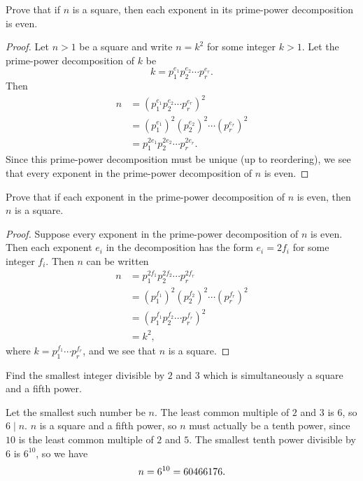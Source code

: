  Prove that if $n$ is a square, then each exponent in its
prime-power decomposition is even.
\begin{proof}
  Let $n>1$ be a square and write $n = k^2$ for some integer
  $k>1$. Let the prime-power decomposition of $k$ be
  \begin{equation*}
    k = p_1^{e_1}p_2^{e_2}\cdots p_r^{e_r}.
  \end{equation*}
  Then
  \begin{align*}
    n &= (p_1^{e_1}p_2^{e_2}\cdots p_r^{e_r})^2 \\
      &= (p_1^{e_1})^2(p_2^{e_2})^2\cdots(p_r^{e_r})^2 \\
      &= p_1^{2e_1}p_2^{2e_2}\cdots p_r^{2e_r}.
  \end{align*}
  Since this prime-power decomposition must be unique (up to
  reordering), we see that every exponent in the prime-power
  decomposition of $n$ is even.
\end{proof}

 Prove that if each exponent in the prime-power decomposition
of $n$ is even, then $n$ is a square.
\begin{proof}
  Suppose every exponent in the prime-power decomposition of $n$ is
  even. Then each exponent $e_i$ in the decomposition has the form
  $e_i = 2f_i$ for some integer $f_i$. Then $n$ can be written
  \begin{align*}
    n &= p_1^{2f_1}p_2^{2f_2}\cdots p_r^{2f_r} \\
      &= (p_1^{f_1})^2(p_2^{f_2})^2\cdots(p_r^{f_r})^2 \\
      &= (p_1^{f_1}p_2^{f_2}\cdots p_r^{f_r})^2 \\
      &= k^2,
  \end{align*}
  where $k = p_1^{f_1}\cdots p_r^{f_r}$, and we see that $n$ is a
  square.
\end{proof}

 Find the smallest integer divisible by $2$ and $3$ which is
simultaneously a square and a fifth power.
\begin{solution}
  Let the smallest such number be $n$. The least common multiple of
  $2$ and $3$ is $6$, so $6\mid n$. $n$ is a square and a fifth power,
  so $n$ must actually be a tenth power, since $10$ is the least
  common multiple of $2$ and $5$. The smallest tenth power divisible
  by $6$ is $6^{10}$, so we have
  \begin{equation*}
    n = 6^{10} = 60466176. \qedhere
  \end{equation*}
\end{solution}

